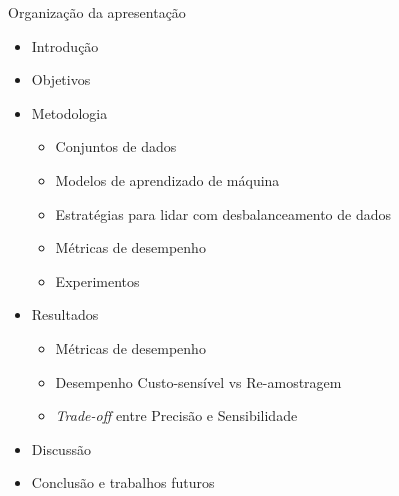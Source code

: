 \begin{frame}
  \titlepage
\end{frame}

\begin{frame}{Organização da apresentação}
  \begin{itemize}
    \item Introdução
    \item Objetivos
    \item Metodologia
      \begin{itemize}
        \item Conjuntos de dados
        \item Modelos de aprendizado de máquina
        \item Estratégias para lidar com desbalanceamento de dados
        \item Métricas de desempenho
        \item Experimentos
      \end{itemize}
    \item Resultados
      \begin{itemize}
        \item Métricas de desempenho
        \item Desempenho Custo-sensível vs Re-amostragem
        \item \textit{Trade-off} entre Precisão e Sensibilidade
      \end{itemize}
    \item Discussão
    \item Conclusão e trabalhos futuros
  \end{itemize}
\end{frame}
